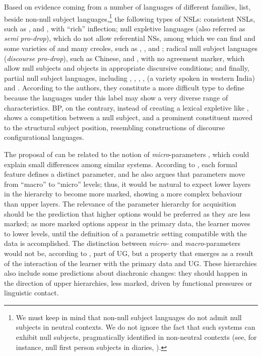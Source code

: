 \documentclass[output=paper]{langsci/langscibook}
\begin{document}
Based on evidence coming from a number of languages of different families,
\citeauthor{RobHol2010} list, beside non-null subject languages,\footnote{We
    must keep in mind that non-null subject languages do not admit null
    subjects in neutral contexts. We do not ignore the fact that such
systems can exhibit null subjects, pragmatically identified in non-neutral
contexts (see, for instance, null first person subjects in  diaries,
\citealt{Haegeman1990}).} the following types of \glspl{NSL}: consistent
\glspl{NSL}, such as ,  and , with “rich”
inflection; null expletive languages (also referred as \emph{semi}
\emph{pro-drop}), which do not allow referential NSs, among which we can find
 and some varieties of  and many creoles, such as
, , and ; radical null
subject
languages (\emph{discourse pro-drop}), such as Chinese,  and
, with no agreement marker, which allow null subjects and objects in
appropriate discursive conditions; and finally, partial null subject languages,
including , , , ,
 (a variety spoken in western India) and .  According to the authors, they constitute a more difficult type
to define because the languages under this label may show a very diverse range
of characteristics. \gls{BP}, on the contrary, instead
of creating a lexical expletive like , shows a
competition between a null subject, and a prominent constituent moved to the
structural subject position, resembling constructions of discourse
configurational languages.

The proposal of  can be related to the notion of
\emph{micro}-parameters \citep{Kayne1996}, which could explain small
differences among similar systems. According to \citet{Roberts2012}, each
formal feature defines a distinct parameter, and he also argues that parameters
move from “macro” to “micro” levels; thus, it would be natural to expect lower
layers in the hierarchy to become more marked, showing a more complex behaviour
than upper layers. The relevance of the parameter hierarchy for acquisition
should be the prediction that higher options would be preferred as they are
less marked; as more marked options appear in the primary data, the learner
moves to lower levels, until the definition of a parametric setting compatible
with the data is accomplished. The distinction between \emph{micro-} and
\emph{macro}-parameters would not be, according to \citet[310]{Roberts2012},
part of \gls{UG}, but a property that emerges as a result of the interaction of the
learner with the primary data and \gls{UG}. These hierarchies also include some
predictions about diachronic changes: they should happen in the direction of
upper hierarchies, less marked, driven by functional pressures or linguistic
contact.
\end{document}
